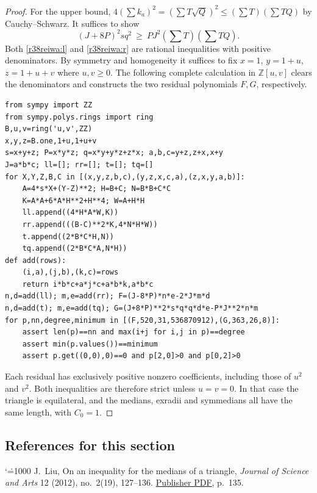 \documentclass[11pt,a4paper]{article}
\makeatletter
\numberwithin{equation}{section}
\theoremstyle{definition}
\theoremstyle{remark}
\renewenvironment{thebibliography}[1]
 {\subsection*{References for this section}\small
  \list{\@biblabel{\@arabic\c@enumiv}}
       {\settowidth\labelwidth{\@biblabel{#1}}\leftmargin\labelwidth
        \advance\leftmargin\labelsep\@openbib@code
        \usecounter{enumiv}\let\p@enumiv\@empty
        \renewcommand\theenumiv{\@arabic\c@enumiv}}
  \sloppy\clubpenalty4000\widowpenalty4000\sfcode`\.=1000\relax}
 {\def\@noitemerr{\@latex@warning{Empty bibliography}}\endlist}
\makeatother
\begin{document}
\begin{proof}
For the upper bound, $4(\sum k_a)^2=(\sum T\sqrt Q)^2\le(\sum T)(\sum TQ)$ by Cauchy--Schwarz. It suffices to show
\begin{equation}\label{r38reiwa:r}
 (J+8P)^2 s q^2\ \ge\ PJ^2(\sum T)(\sum TQ).
\end{equation}
Both \eqref{r38reiwa:l} and \eqref{r38reiwa:r} are rational inequalities with positive denominators. By symmetry and homogeneity it suffices to fix $x=1$, $y=1+u$, $z=1+u+v$ where $u,v\ge0$. The following complete calculation in $\mathbb Z[u,v]$ clears the denominators and constructs the two residual polynomials $F,G$, respectively.
\begin{small}
\begin{Verbatim}
from sympy import ZZ
from sympy.polys.rings import ring
B,u,v=ring('u,v',ZZ)
x,y,z=B.one,1+u,1+u+v
s=x+y+z; P=x*y*z; q=x*y+y*z+z*x; a,b,c=y+z,z+x,x+y
J=a*b*c; ll=[]; rr=[]; t=[]; tq=[]
for X,Y,Z,B,C in [(x,y,z,b,c),(y,z,x,c,a),(z,x,y,a,b)]:
    A=4*s*X+(Y-Z)**2; H=B+C; N=B*B+C*C
    K=A*A+6*A*H**2+H**4; W=A+H*H
    ll.append((4*H*A*W,K))
    rr.append(((B-C)**2*K,4*N*H*W))
    t.append((2*B*C*H,N))
    tq.append((2*B*C*A,N*H))
def add(rows):
    (i,a),(j,b),(k,c)=rows
    return i*b*c+a*j*c+a*b*k,a*b*c
n,d=add(ll); m,e=add(rr); F=(J-8*P)*n*e-2*J*m*d
n,d=add(t); m,e=add(tq); G=(J+8*P)**2*s*q*q*d*e-P*J**2*n*m
for p,nn,degree,minimum in [(F,520,31,536870912),(G,363,26,8)]:
    assert len(p)==nn and max(i+j for i,j in p)==degree
    assert min(p.values())==minimum
    assert p.get((0,0),0)==0 and p[2,0]>0 and p[0,2]>0
\end{Verbatim}

\end{small}
Each residual has exclusively positive nonzero coefficients, including those of $u^2$ and $v^2$. Both inequalities are therefore strict unless $u=v=0$. In that case the triangle is equilateral, and the medians, exradii and symmedians all have the same length, with $C_0=1$.
\end{proof}
\begin{thebibliography}{1}
 J.~Liu, On an inequality for the medians of a triangle, \emph{Journal of Science and Arts} 12 (2012), no.~2(19), 127--136. \href{https://www.josa.ro/docs/josa_2012_2/a_03_Liu_J.pdf}{Publisher PDF}, p.~135.
\end{thebibliography}

\par\endgroup

\begingroup
\newcommand{\cyc}{\sum_{\rm cyc}}
\end{document}
